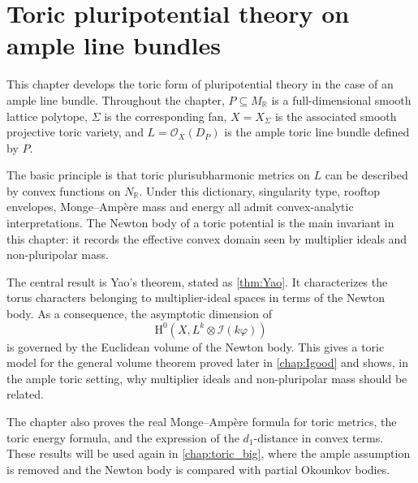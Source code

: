 \chapter{Toric pluripotential theory on ample line bundles}
\label{chap:toric_ample}

This chapter develops the toric form of pluripotential theory in the case of an ample line bundle. Throughout the chapter, $P\subseteq M_{\mathbb R}$ is a full-dimensional smooth lattice polytope, $\Sigma$ is the corresponding fan, $X=X_\Sigma$ is the associated smooth projective toric variety, and $L=\mathcal O_X(D_P)$ is the ample toric line bundle defined by $P$.

The basic principle is that toric plurisubharmonic metrics on $L$ can be described by convex functions on $N_{\mathbb R}$. Under this dictionary, singularity type, rooftop envelopes, Monge--Amp\`ere mass and energy all admit convex-analytic interpretations. The Newton body of a toric potential is the main invariant in this chapter: it records the effective convex domain seen by multiplier ideals and non-pluripolar mass.

The central result is Yao's theorem, stated as \cref{thm:Yao}. It characterizes the torus characters belonging to multiplier-ideal spaces in terms of the Newton body. As a consequence, the asymptotic dimension of
\[
    \mathrm{H}^0\left(X,L^k\otimes\mathcal I(k\varphi)\right)
\]
is governed by the Euclidean volume of the Newton body. This gives a toric model for the general volume theorem proved later in \cref{chap:Igood} and shows, in the ample toric setting, why multiplier ideals and non-pluripolar mass should be related.

The chapter also proves the real Monge--Amp\`ere formula for toric metrics, the toric energy formula, and the expression of the $d_1$-distance in convex terms. These results will be used again in \cref{chap:toric_big}, where the ample assumption is removed and the Newton body is compared with partial Okounkov bodies.

